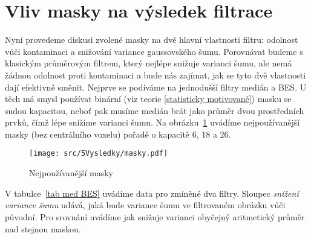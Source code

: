 
\section{Vliv masky na výsledek filtrace}\label{diskuse masky}

    Nyní provedeme diskusi zvolené masky na dvě hlavní vlastnosti filtru: odolnost vůči kontaminaci a snižování variance gaussovského šumu. Porovnávat budeme s klasickým průměrovým filtrem, který nejlépe snižuje varianci šumu, ale nemá žádnou odolnost proti kontaminaci a bude nás zajímat, jak se tyto dvě vlastnosti dají efektivně směnit. Nejprve se podíváme na jednodušší filtry medián a BES. U těch má smysl používat binární (viz teorie \ref{statisticky motivované}) masku se sudou kapacitou, neboť pak musíme medián brát jako průměr dvou prostředních prvků, čímž lépe snížíme varianci šumu. Na obrázku~\ref{obr masky} uvádíme nejpoužívanější masky (bez centrálního voxelu) pořadě o kapacitě 6, 18 a 26.

\begin{figure}[h]\label{obr masky}
  \texttt{[image: src/5Vysledky/masky.pdf]}
  \caption{Nejpoužívanější masky}
\end{figure}

    V tabulce~\ref{tab med BES} uvádíme data pro zmíněné dva filtry. Sloupec \emph{snížení variance šumu} udává, jaká bude variance šumu ve filtrovaném obrázku vůči původní. Pro srovnání uvádíme jak snižuje varianci obyčejný aritmetický průměr nad stejnou maskou.

